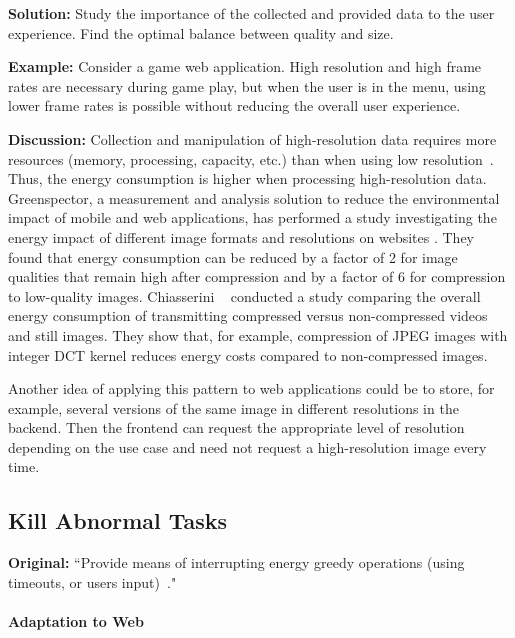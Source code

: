 \textbf{Solution:} Study the importance of the collected and provided data to the user experience. Find the optimal balance between quality and size. 

\textbf{Example:} Consider a game web application. High resolution and high frame rates are necessary during game play, but when the user is in the menu, using lower frame rates is possible without reducing the overall user experience.

\textbf{Discussion:} Collection and manipulation of high-resolution data requires more resources (\eg memory, processing, capacity, etc.) than when using low resolution~\cite{cruz2019catalog}. Thus, the energy consumption is higher when processing high-resolution data.
Greenspector, a measurement and analysis solution to reduce the environmental impact of mobile and web applications, has performed a study investigating the energy impact of different image formats and resolutions on websites \cite{energy-consumption-image-format}. They found that energy consumption can be reduced by a factor of 2 for image qualities that remain high after compression and by a factor of 6 for compression to low-quality images. Chiasserini \etal~\cite{Chiasserini2002} conducted a study comparing the overall energy consumption of transmitting compressed versus non-compressed videos and still images. They show that, for example, compression of JPEG images with integer DCT kernel reduces energy costs compared to non-compressed images.

Another idea of applying this pattern to web applications could be to store, for example, several versions of the same image in different resolutions in the backend. Then the frontend can request the appropriate level of resolution depending on the use case and need not request a high-resolution image every time.


\subsection{Kill Abnormal Tasks} \label{sec:patterns-KillAbnormalTasks}
\textbf{Original:} ``Provide means of interrupting energy greedy operations (\eg using timeouts, or users input)~\cite{cruz2019catalog}."

\paragraph{Adaptation to Web}\mbox{}

